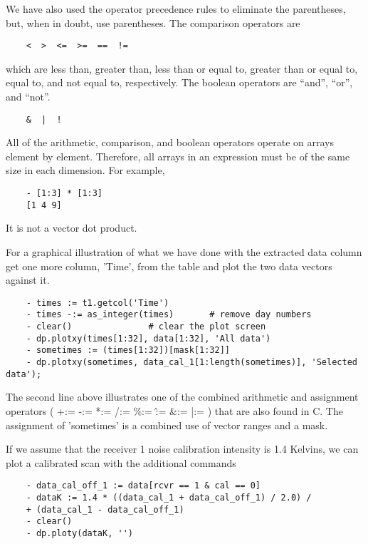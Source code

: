 We have also used the operator precedence rules to eliminate the
parentheses, but, when in doubt, use parentheses. The comparison operators
are

\begin{verbatim}
	<  >  <=  >=  ==  !=
\end{verbatim}

which are less than, greater than, less than or equal to, greater than or
equal to, equal to, and not equal to, respectively.  The boolean operators
are ``and'', ``or'', and ``not''.

\begin{verbatim}
	&  |  !
\end{verbatim}

All of the arithmetic, comparison, and boolean operators operate on arrays
element by element.  Therefore, all arrays in an expression must be of the
same size in each dimension.  For example,

\begin{verbatim}
	- [1:3] * [1:3]
	[1 4 9]
\end{verbatim}

It is not a vector dot product.

    For a graphical illustration of what we have done with the extracted
data column get one more column, 'Time', from the table and plot the two
data vectors against it.

\begin{verbatim}
	- times := t1.getcol('Time')
	- times -:= as_integer(times)		# remove day numbers
	- clear()				# clear the plot screen
	- dp.plotxy(times[1:32], data[1:32], 'All data')
	- sometimes := (times[1:32])[mask[1:32]]
	- dp.plotxy(sometimes, data_cal_1[1:length(sometimes)], 'Selected data');
\end{verbatim}

The second line above illustrates one of the combined arithmetic and
assignment operators ( +:= -:= *:= /:= \%:= \^:= \&:= |:= ) that are also
found in C.  The assignment of 'sometimes' is a combined use of vector
ranges and a mask.

    If we assume that the receiver 1 noise calibration intensity is 1.4
Kelvins, we can plot a calibrated scan with the additional commands

\begin{verbatim}
	- data_cal_off_1 := data[rcvr == 1 & cal == 0]
	- dataK := 1.4 * ((data_cal_1 + data_cal_off_1) / 2.0) /
	+ (data_cal_1 - data_cal_off_1)
	- clear()
	- dp.ploty(dataK, '')
\end{verbatim}


